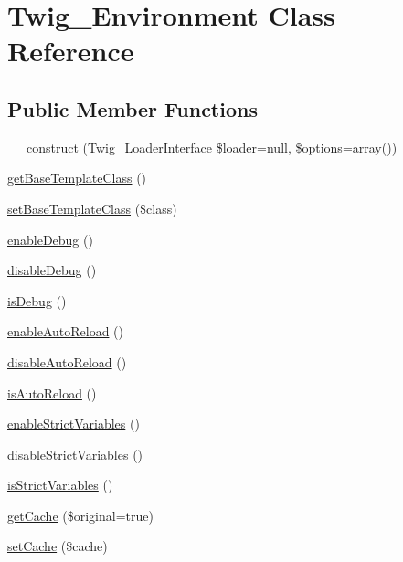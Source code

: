 \hypertarget{classTwig__Environment}{}\section{Twig\+\_\+\+Environment Class Reference}
\label{classTwig__Environment}
\subsection*{Public Member Functions}
\begin{DoxyCompactItemize}
\item 
\hyperlink{classTwig__Environment_a43cf117fe377c1b41901346f34d74374}{\+\_\+\+\_\+construct} (\hyperlink{interfaceTwig__LoaderInterface}{Twig\+\_\+\+Loader\+Interface} \$loader=null, \$options=array())
\item 
\hyperlink{classTwig__Environment_ae62d1bb671a3245b77d87bea93fac547}{get\+Base\+Template\+Class} ()
\item 
\hyperlink{classTwig__Environment_a0a2b0852877c0289b31353cbb13d374a}{set\+Base\+Template\+Class} (\$class)
\item 
\hyperlink{classTwig__Environment_a852df29efc655c0a4531d249a57efb33}{enable\+Debug} ()
\item 
\hyperlink{classTwig__Environment_a14381c36f34835d4fd7f8204a6758089}{disable\+Debug} ()
\item 
\hyperlink{classTwig__Environment_a06f5a98bc81cac6100e430043e028b3b}{is\+Debug} ()
\item 
\hyperlink{classTwig__Environment_ab39ed30f1aa7c2da3b503959b784e03c}{enable\+Auto\+Reload} ()
\item 
\hyperlink{classTwig__Environment_a05f96bb8d33337a5b7f4e0d7047e8664}{disable\+Auto\+Reload} ()
\item 
\hyperlink{classTwig__Environment_aad7091a7b21e3c74d7196602fe4b73d8}{is\+Auto\+Reload} ()
\item 
\hyperlink{classTwig__Environment_abe645cf00af3b70a2a252bb20d26b34d}{enable\+Strict\+Variables} ()
\item 
\hyperlink{classTwig__Environment_a4813ef5726e51e179ccf9bee3e8929a7}{disable\+Strict\+Variables} ()
\item 
\hyperlink{classTwig__Environment_a4536a307cafb525b8dba3662534ce44f}{is\+Strict\+Variables} ()
\item 
\hyperlink{classTwig__Environment_af5731ddfe08fa1eb24f151852e884361}{get\+Cache} (\$original=true)
\item 
\hyperlink{classTwig__Environment_a812dcb3eaa23929319b543791ec553c4}{set\+Cache} (\$cache)

\end{DoxyCompactItemize}
